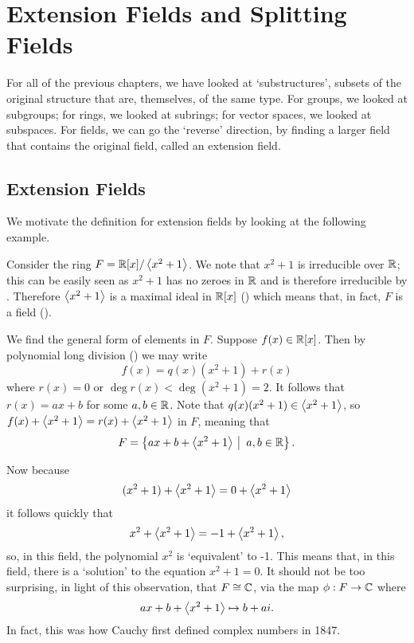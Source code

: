 \chapter{Extension Fields and Splitting Fields}
For all of the previous chapters, we have looked at `substructures', subsets of the original structure that are, themselves, of the same type. For groups, we looked at subgroups; for rings, we looked at subrings; for vector spaces, we looked at subspaces. For fields, we can go the `reverse' direction, by finding a larger field that contains the original field, called an extension field.

\section{Extension Fields}
We motivate the definition for extension fields by looking at the following example.

\begin{example}\label{example-R[x]-mod-x^2+1-is-isomorphic-to-C}
    Consider the ring $F = \mathbb{R}[x]/\left\langle x^2+1\right\rangle$. We note that $x^2 + 1$ is irreducible over $\mathbb{R}$; this can be easily seen as $x^2+1$ has no zeroes in $\mathbb{R}$ and is therefore irreducible by . Therefore $\left\langle x^2+1\right\rangle$ is a maximal ideal in $\mathbb{R}[x]$ () which means that, in fact, $F$ is a field ().

    We find the general form of elements in $F$. Suppose $f(x) \in \mathbb{R}[x]$. Then by polynomial long division () we may write
    \[
        f(x) = q(x)(x^2+1) + r(x)
    \]
    where $r(x) = 0$ or $\deg r(x) < \deg(x^2+1) = 2$. It follows that $r(x) = ax + b$ for some $a, b \in \mathbb{R}$. Note that $q(x)(x^2+1) \in \left\langle x^2+1\right\rangle$, so $f(x) + \left\langle x^2+1\right\rangle = r(x) + \left\langle x^2+1\right\rangle$ in $F$, meaning that
    \[
        F = \left\{ax + b + \princ{x^2+1} \vert a,b\in \R\right\}.
    \]

    Now because
    \[
        (x^2 + 1) + \left\langle x^2 + 1\right\rangle = 0 + \left\langle x^2+1\right\rangle
    \]
    it follows quickly that
    \[
        x^2 + \left\langle x^2 + 1\right\rangle = -1 + \left\langle x^2+1\right\rangle,
    \]
    so, in this field, the polynomial $x^2$ is `equivalent' to -1. This means that, in this field, there is a `solution' to the equation $x^2 + 1 = 0$. It should not be too surprising, in light of this observation, that $F \cong \mathbb{C}$, via the map $\phi: F \to \mathbb{C}$ where
    \[
        ax + b + \left\langle x^2 + 1\right\rangle \mapsto b + ai.
    \]
    In fact, this was how Cauchy first defined complex numbers in 1847.
\end{example}


